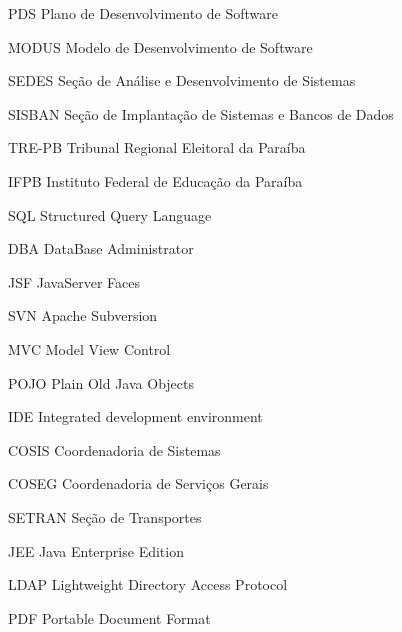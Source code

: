 
\begin{siglas}
    \item[PDS] Plano de Desenvolvimento de Software
    \item[MODUS] Modelo de Desenvolvimento de Software
    \item[SEDES] Seção de Análise e Desenvolvimento de Sistemas
    \item[SISBAN]Seção de Implantação de Sistemas e Bancos de Dados
    \item[TRE-PB] Tribunal Regional Eleitoral da Paraíba
    \item[IFPB] Instituto Federal de Educação da Paraíba
    \item[SQL] Structured Query Language
    \item[DBA] DataBase Administrator
    \item[JSF] JavaServer Faces
    \item[SVN] Apache Subversion
    \item[MVC] Model View Control
    \item[POJO] Plain Old Java Objects
    \item[IDE] Integrated development environment
    \item[COSIS] Coordenadoria de Sistemas
    \item[COSEG] Coordenadoria de Serviços Gerais
    \item[SETRAN] Seção de Transportes
    \item[JEE] Java Enterprise Edition
    \item[LDAP] Lightweight Directory Access Protocol
    \item[PDF] Portable Document Format
\end{siglas}

